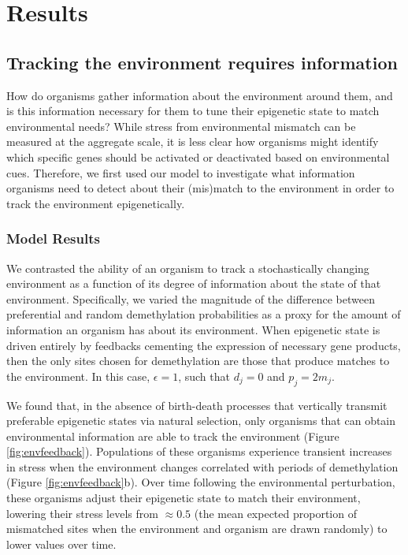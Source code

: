 \documentclass{article}
\begin{document}
\clearpage

\section{Results}

\subsection{Tracking the environment requires information}
How do organisms gather information about the environment around them, and is this information necessary for them to tune their epigenetic state to match environmental needs? While stress from environmental mismatch can be measured at the aggregate scale, it is less clear how organisms might identify which specific genes should be activated or deactivated based on environmental cues. Therefore, we first used our model to investigate what information organisms need to detect about their (mis)match to the environment in order to track the environment epigenetically.

\subsubsection{Model Results}
We contrasted the ability of an organism to track a stochastically changing environment as a function of its degree of information about the state of that environment. Specifically, we varied the magnitude of the difference between preferential and random demethylation probabilities as a proxy for the amount of information an organism has about its environment. When epigenetic state is driven entirely by feedbacks cementing the expression of necessary gene products, then the only sites chosen for demethylation are those that produce matches to the environment. In this case, $\epsilon = 1$, such that $d_j = 0$ and $p_j = 2m_j$. 


We found that, in the absence of birth-death processes that vertically transmit preferable epigenetic states via natural selection, only organisms that can obtain environmental information are able to track the environment (Figure \ref{fig:envfeedback}). Populations of these organisms experience transient increases in stress when the environment changes correlated with periods of demethylation (Figure \ref{fig:envfeedback}b). Over time following the environmental perturbation, these organisms adjust their epigenetic state to match their environment, lowering their stress levels from $\approx 0.5$ (the mean expected proportion of mismatched sites when the environment and organism are drawn randomly) to lower values over time. 
\end{document}
